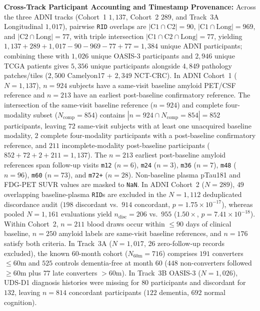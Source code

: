\documentclass[10pt,twocolumn]{article}
\begin{document}
\noindent\textbf{Cross-Track Participant Accounting and Timestamp Provenance:}
Across the three ADNI tracks (Cohort~1 $1,137$, Cohort~2 $289$, and Track~3A Longitudinal
$1,017$), pairwise \texttt{RID} overlaps are $|\text{C1}\cap\text{C2}|=90$,
$|\text{C1}\cap\text{Long}|=969$, and $|\text{C2}\cap\text{Long}|=77$, with triple intersection
$|\text{C1}\cap\text{C2}\cap\text{Long}|=77$, yielding $1,137 + 289 + 1,017 - 90 - 969 - 77 +
77 = 1,384$ unique ADNI participants; combining these with $1,026$ unique OASIS-3 participants
and $2,946$ unique TCGA patients gives $5,356$ unique participants alongside $4,849$ pathology
patches/tiles ($2,500$ Camelyon17 + $2,349$ NCT-CRC). In ADNI Cohort~1 ($N=1,137$), $n=924$
subjects have a same-visit baseline amyloid PET/CSF reference and $n=213$ have an earliest
post-baseline confirmatory reference. The intersection of the same-visit baseline reference
($n=924$) and complete four-modality subset ($N_{\text{comp}}=854$) contains
$|n=924 \cap N_{\text{comp}}=854|=852$ participants, leaving $72$ same-visit subjects with
at least one unacquired baseline modality, $2$ complete four-modality participants with a
post-baseline confirmatory reference, and $211$ incomplete-modality post-baseline participants
($852+72+2+211=1,137$). The $n=213$ earliest post-baseline amyloid references span follow-up
visits \texttt{m12} ($n=6$), \texttt{m24} ($n=3$), \texttt{m36} ($n=7$), \texttt{m48}
($n=96$), \texttt{m60} ($n=73$), and \texttt{m72+} ($n=28$). Non-baseline plasma pTau181
and FDG-PET SUVR values are masked to \texttt{NaN}. In ADNI Cohort~2 ($N=289$), $49$
overlapping baseline-plasma
\texttt{RID}s are excluded in the $N=1,112$ deduplicated discordance audit ($198$ discordant
vs.\ $914$ concordant, $p=1.75\times 10^{-17}$), whereas pooled $N=1,161$ evaluations yield
$n_{\text{disc}}=206$ vs.\ $955$ ($1.50\times$, $p=7.41\times 10^{-18}$). Within Cohort~2,
$n=211$ blood draws occur within $\le 90$ days of clinical baseline, $n=250$ amyloid labels are
same-visit baseline references, and $n=176$ satisfy both criteria. In Track~3A ($N=1,017$, 26
zero-follow-up records excluded), the known 60-month cohort ($N_{60\text{m}}=716$) comprises
$191$ converters $\le 60$m and $525$ controls dementia-free at month 60 ($448$ non-converters
followed $\ge 60$m plus $77$ late converters $> 60$m). In Track~3B OASIS-3 ($N=1,026$), UDS-D1
diagnosis histories were missing for $80$ participants and discordant for $132$, leaving
$n=814$ concordant participants ($122$ dementia, $692$ normal cognition).
\end{document}
